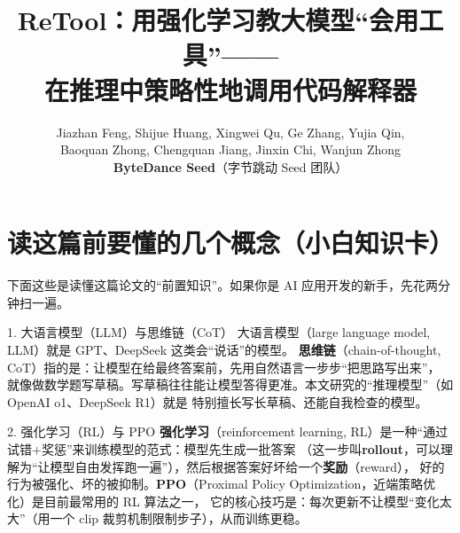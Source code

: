 \documentclass[11pt,UTF8,fontset=fandol]{ctexart}
\title{\textbf{ReTool：用强化学习教大模型“会用工具”——\\在推理中策略性地调用代码解释器}}
\author{Jiazhan Feng, Shijue Huang, Xingwei Qu, Ge Zhang, Yujia Qin,\\
Baoquan Zhong, Chengquan Jiang, Jinxin Chi, Wanjun Zhong\\
\textbf{ByteDance Seed}（字节跳动 Seed 团队）}
\date{}
\begin{document}
\maketitle

\begin{center}
\end{center}

\vspace{0.5em}

\section{读这篇前要懂的几个概念（小白知识卡）}

下面这些是读懂这篇论文的“前置知识”。如果你是 AI 应用开发的新手，先花两分钟扫一遍。

\begin{infobox}{1. 大语言模型（LLM）与思维链（CoT）}
大语言模型（large language model, LLM）就是 GPT、DeepSeek 这类会“说话”的模型。
\textbf{思维链}（chain-of-thought, CoT）指的是：让模型在给最终答案前，先用自然语言一步步“把思路写出来”，
就像做数学题写草稿。写草稿往往能让模型答得更准。本文研究的“推理模型”（如 OpenAI o1、DeepSeek R1）就是
特别擅长写长草稿、还能自我检查的模型。
\end{infobox}

\begin{infobox}{2. 强化学习（RL）与 PPO}
\textbf{强化学习}（reinforcement learning, RL）是一种“通过试错+奖惩”来训练模型的范式：模型先生成一批答案
（这一步叫\textbf{rollout}，可以理解为“让模型自由发挥跑一遍”），然后根据答案好坏给一个\textbf{奖励}（reward），
好的行为被强化、坏的被抑制。\textbf{PPO}（Proximal Policy Optimization，近端策略优化）是目前最常用的 RL 算法之一，
它的核心技巧是：每次更新不让模型“变化太大”（用一个 clip 裁剪机制限制步子），从而训练更稳。
\end{infobox}
\end{document}
